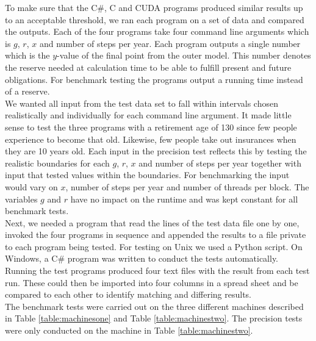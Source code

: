 To make sure that the C\#, C and CUDA programs produced similar results up to an acceptable threshold, we ran each program on a set of data and compared the outputs. Each of the four programs take four command line arguments which is $g$, $r$, $x$ and number of steps per year. Each program outputs a single number which is the $y$-value of the final point from the outer model. This number denotes the reserve needed at calculation time to be able to fulfill present and future obligations. For benchmark testing the programs output a running time instead of a reserve.\\

We wanted all input from the test data set to fall within intervals chosen realistically and individually for each command line argument. It made little sense to test the three programs with a retirement age of 130 since few people experience to become that old. Likewise, few people take out insurances when they are 10 years old. Each input in the precision test reflects this by testing the realistic boundaries for each $g$, $r$, $x$ and number of steps per year together with input that tested values within the boundaries. For benchmarking the input would vary on $x$, number of steps per year and number of threads per block. The variables $g$ and $r$ have no impact on the runtime and was kept constant for all benchmark tests.\\

Next, we needed a program that read the lines of the test data file one by one, invoked the four programs in sequence and appended the results to a file private to each program being tested. For testing on Unix we used a Python script. On Windows, a C\# program was written to conduct the tests automatically.\\

Running the test programs produced four text files with the result from each test run. These could then be imported into four columns in a spread sheet and be compared to each other to identify matching and differing results.\\

The benchmark tests were carried out on the three different machines described in Table \ref{table:machinesone} and Table \ref{table:machinestwo}. The precision tests were only conducted on the machine in Table \ref{table:machinestwo}.

